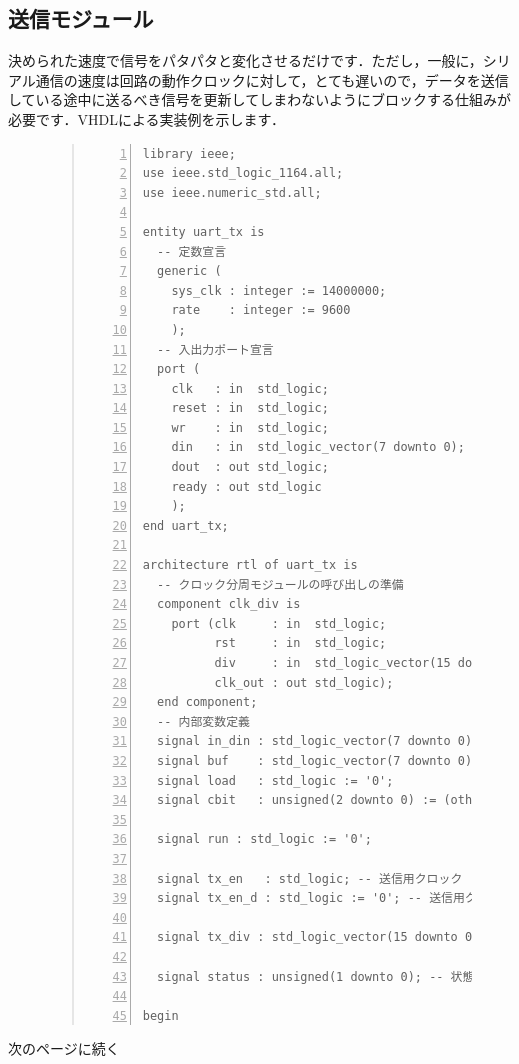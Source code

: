 \documentclass[a4paper,dvipdfmx]{jsarticle}
\begin{document}
\subsection{送信モジュール}
決められた速度で信号をパタパタと変化させるだけです．ただし，一般に，シリアル通信の速度は回路の動作クロックに対して，とても遅いので，データを送信している途中に送るべき信号を更新してしまわないようにブロックする仕組みが必要です．VHDLによる実装例を示します．

\begin{figure}[H]
\begin{quote}
\begin{Verbatim}[frame=single, numbers=left, baselinestretch=0.8]
library ieee;
use ieee.std_logic_1164.all;
use ieee.numeric_std.all;

entity uart_tx is
  -- 定数宣言
  generic (
    sys_clk : integer := 14000000;             --クロック周波数
    rate    : integer := 9600                  --転送レート,単位はbps(ビット毎秒)
    );
  -- 入出力ポート宣言
  port (
    clk   : in  std_logic;                     -- クロック
    reset : in  std_logic;                     -- リセット
    wr    : in  std_logic;                     -- 送信要求
    din   : in  std_logic_vector(7 downto 0);  --送信データ
    dout  : out std_logic;                     --シリアル出力
    ready : out std_logic                      --送信要求を受け付けられるか
    );
end uart_tx;

architecture rtl of uart_tx is
  -- クロック分周モジュールの呼び出しの準備
  component clk_div is
    port (clk     : in  std_logic;
          rst     : in  std_logic;
          div     : in  std_logic_vector(15 downto 0);
          clk_out : out std_logic);
  end component;
  -- 内部変数定義
  signal in_din : std_logic_vector(7 downto 0);  -- 送信データ一時保存用レジスタ
  signal buf    : std_logic_vector(7 downto 0);  -- 一時的にしようするバッファ
  signal load   : std_logic := '0';              -- 送信データを読み込んだかどうか
  signal cbit   : unsigned(2 downto 0) := (others => '0');  -- 送信するビット番号

  signal run : std_logic := '0';               -- 送信状態にあるかどうか

  signal tx_en   : std_logic; -- 送信用クロック
  signal tx_en_d : std_logic := '0'; -- 送信用クロックの立ち上がり検出用
  
  signal tx_div : std_logic_vector(15 downto 0); -- クロック分周の倍率

  signal status : unsigned(1 downto 0); -- 状態遷移用レジスタ

begin
\end{Verbatim}
\end{quote}
\end{figure}
次のページに続く
\end{document}
